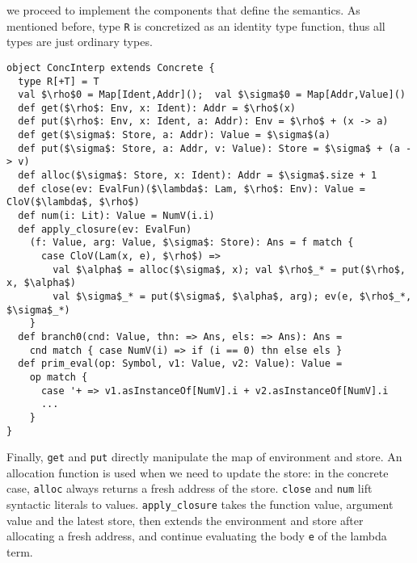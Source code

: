 we proceed to implement the components that define the semantics. 
As mentioned before, type \texttt{R} is concretized as an identity type function, thus
all types are just ordinary types.

\begin{lstlisting}
object ConcInterp extends Concrete {
  type R[+T] = T
  val $\rho$0 = Map[Ident,Addr]();  val $\sigma$0 = Map[Addr,Value]()
  def get($\rho$: Env, x: Ident): Addr = $\rho$(x)
  def put($\rho$: Env, x: Ident, a: Addr): Env = $\rho$ + (x -> a)
  def get($\sigma$: Store, a: Addr): Value = $\sigma$(a)
  def put($\sigma$: Store, a: Addr, v: Value): Store = $\sigma$ + (a -> v)
  def alloc($\sigma$: Store, x: Ident): Addr = $\sigma$.size + 1
  def close(ev: EvalFun)($\lambda$: Lam, $\rho$: Env): Value = CloV($\lambda$, $\rho$)
  def num(i: Lit): Value = NumV(i.i)
  def apply_closure(ev: EvalFun)
    (f: Value, arg: Value, $\sigma$: Store): Ans = f match {
      case CloV(Lam(x, e), $\rho$) =>
        val $\alpha$ = alloc($\sigma$, x); val $\rho$_* = put($\rho$, x, $\alpha$)
        val $\sigma$_* = put($\sigma$, $\alpha$, arg); ev(e, $\rho$_*, $\sigma$_*)
    }
  def branch0(cnd: Value, thn: => Ans, els: => Ans): Ans = 
    cnd match { case NumV(i) => if (i == 0) thn else els }
  def prim_eval(op: Symbol, v1: Value, v2: Value): Value = 
    op match {
      case '+ => v1.asInstanceOf[NumV].i + v2.asInstanceOf[NumV].i
      ...
    }
}
\end{lstlisting}

Finally, \texttt{get} and \texttt{put} directly manipulate the map of environment and store. 
An allocation function is used when we need to update the store: 
in the concrete case, \texttt{alloc} always returns a fresh address of the store.
\texttt{close} and \texttt{num} lift syntactic literals to values.
\texttt{apply\_closure} takes the function value, argument value and the latest store,
then extends the environment and store after allocating a fresh address, and continue
evaluating the body \texttt{e} of the lambda term.
